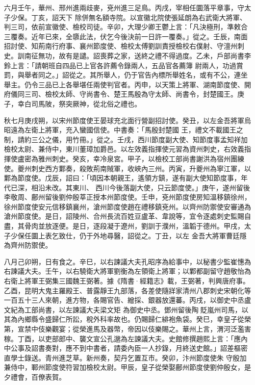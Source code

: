 \begin{pinyinscope}
 六月壬午，華州、邢州進兩歧麥，兗州進三足鳥。丙戌，宰相任圜落平章事，守太子少保。丁亥，詔天下
 除併無名額寺院。以宣徽北院使張延朗為右武衛大將軍、判三司，依前宣徽使、檢校司徒。辛卯，大理少卿王鬱上言：「凡決極刑，準敕合三覆奏。近年已來，全隳此法，伏乞今後決前一日許一覆奏。」從之。壬辰，南面招討使、知荊南行府事、襄州節度使、檢校太傅劉訓責授檢校右僕射、守澶州刺史。訓南征無功，故有是譴。詔喪葬之家，送終之禮不得過度。乙未，戶部尚書李鈴上言：「請朝班自四品已上官各許薦令錄兩人，五品官各薦簿
 尉兩人，功過賞罰，與舉者同之。」詔從之。其所舉人，仍于官告內標所舉姓名，或有不公，連坐舉主。仍令三品已上各舉堪任兩使判官者。丙申，以天策上將軍、湖南節度使、開府儀同三司、檢校太師、守尚書令、楚王馬殷為守太師、尚書令，封楚國王。庚子，幸白司馬陂，祭突厥神，從北俗之禮也。



 秋七月庚戌朔，以宋州節度使王晏球充北面行營副招討使。癸丑，以左金吾將軍烏昭遠為左衛上將軍，充入蠻國信使。中書奏：「馬殷封楚國
 王，禮文不載國王之制，請約三公之儀，用竹冊。」從之。壬戌，西川節度副大使、知節度事孟知祥加檢校太尉、兼侍中，東川董璋加爵邑。以左效義指揮使元習為資州刺史，右效義指揮使盧密為雅州刺史。癸亥，幸冷泉宮。甲子，以檢校工部尚書謝洪為宿州團練使。夔州刺史西方鄴奏，殺敗荊南賊軍，收峽內三州。丙寅，升夔州為寧江軍，以鄴為節度使。戊辰，詔曰：「頃因本朝親王，遙領方鎮，遂有副大使知節度事，年代已深，相沿未改。其東川、
 西川今後落副大使，只云節度使。」庚午，遂州留後李敬周、鄜州留後劉仲殷莘正授本州節度使。壬申，兗州節度使房知溫移鎮徐州，徐州節度使安元信移鎮襄州，滄州節度使趙在禮移鎮兗州。以齊州防禦使安審通為滄州節度使。是日，詔陵州、合州長流百姓豆盧革、韋說等，宜令逐處刺史監賜自盡，其骨肉並放逐便。是日，逐段凝于遼州，劉訓于濮州，溫韜于德州。甲戌，太子少保任圜上表乞致仕，仍于外地尋醫，詔從之。丁丑，以左
 金吾大將軍曹廷隱為齊州防禦使。



 八月己卯朔，日有食之。辛巳，以右諫議大夫孔昭序為給事中，以秘書少監崔憓為右諫議大夫。壬午，以右驍衛大將軍劉衡為左領衛上將軍；以鄴都副留守趙敬怡為右衛上將軍王弼集三國魏王弼著。據《隋書·經籍志》載，王弼著，判興唐府事。乙酉，昆明大鬼主羅殿王、普露靜王九部落，各差使隨牂家清州八郡刺史宋朝化等一百五十三人來朝，進方物，各賜官告、繒採、銀器放還蕃。丙戌，以御史中丞盧文紀為工部尚書，以左諫議大夫梁文矩
 為御史中丞。鄧州留後陶貶嵐州司馬，以其為內鄉縣令盛歸仁所訟，稅外科率故也。仍賜歸仁緋袍魚袋。癸巳，幸皇子從榮第，宣禁中伎樂觀宴；從榮進馬及器幣，帝因以伎樂賜之。華州上言，渭河泛濫害稼。丁酉，以吏部郎中、襲文宣公孔邈為左諫議大夫。史館修撰趙熙上言：「應內中公事及詔書奏對，應不到中書者，請委內臣一人抄錄，月終送史館。」詔差樞密直學士錄送。青州進芝草。新州奏，契丹乞置互市。癸卯，汴州節度使朱
 守殷加兼侍中，鄆州節度使符習加檢校太尉。甲辰，皇子從榮娶鄜州節度使劉仲殷女，是夕禮會，百僚表賀。




\end{pinyinscope}
